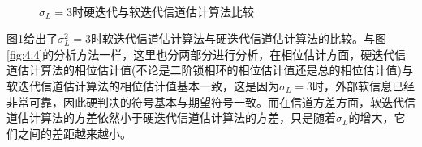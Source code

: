 \begin{figure}
    \centering
    \\
    \caption{$\sigma_L=3$时硬迭代与软迭代信道估计算法比较}
    \label{fig:4.5}
\end{figure}
图\ref{fig:4.5}给出了$\sigma_L^2=3$时软迭代信道估计算法与硬迭代信道估计算法的比较。与图\ref{fig:4.4}的分析方法一样，这里也分两部分进行分析，在相位估计方面，硬迭代信道估计算法的相位估计值(不论是二阶锁相环的相位估计值还是总的相位估计值)与软迭代信道估计算法的相位估计值基本一致，这是因为$\sigma_L=3$时，外部软信息已经非常可靠，因此硬判决的符号基本与期望符号一致。而在信道方差方面，软迭代信道估计算法的方差依然小于硬迭代信道估计算法的方差，只是随着$\sigma_L$的增大，它们之间的差距越来越小。
